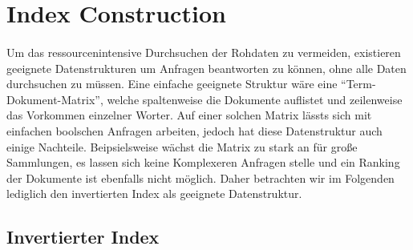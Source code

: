 \section{Index Construction} \label{IndexConstruction}
\paragraph{}
Um das ressourcenintensive Durchsuchen der Rohdaten zu vermeiden, existieren geeignete Datenstrukturen um Anfragen beantworten zu können, ohne alle Daten durchsuchen zu müssen. Eine einfache geeignete Struktur wäre eine \enquote{Term-Dokument-Matrix}, welche spaltenweise die Dokumente auflistet und zeilenweise das Vorkommen einzelner Worter. Auf einer solchen Matrix lässts sich mit einfachen boolschen Anfragen arbeiten, jedoch hat diese Datenstruktur auch einige Nachteile. Beipsielsweise wächst die Matrix zu stark an für große Sammlungen, es lassen sich keine Komplexeren Anfragen stelle und ein Ranking der Dokumente ist ebenfalls nicht möglich. Daher betrachten wir im Folgenden lediglich den invertierten Index als geeignete Datenstruktur.
\par
\subsection{Invertierter Index} \label{invertedIndex}
